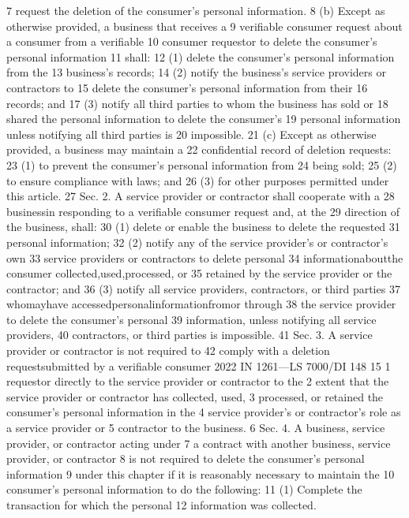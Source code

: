 7 request the deletion of the consumer's personal information.
8 (b) Except as otherwise provided, a business that receives a
9 verifiable consumer request about a consumer from a verifiable
10 consumer requestor to delete the consumer's personal information
11 shall:
12 (1) delete the consumer's personal information from the
13 business's records;
14 (2) notify the business's service providers or contractors to
15 delete the consumer's personal information from their
16 records; and
17 (3) notify all third parties to whom the business has sold or
18 shared the personal information to delete the consumer's
19 personal information unless notifying all third parties is
20 impossible.
21 (c) Except as otherwise provided, a business may maintain a
22 confidential record of deletion requests:
23 (1) to prevent the consumer's personal information from
24 being sold;
25 (2) to ensure compliance with laws; and
26 (3) for other purposes permitted under this article.
27 Sec. 2. A service provider or contractor shall cooperate with a
28 businessin responding to a verifiable consumer request and, at the
29 direction of the business, shall:
30 (1) delete or enable the business to delete the requested
31 personal information;
32 (2) notify any of the service provider's or contractor's own
33 service providers or contractors to delete personal
34 informationaboutthe consumer collected,used,processed, or
35 retained by the service provider or the contractor; and
36 (3) notify all service providers, contractors, or third parties
37 whomayhave accessedpersonalinformationfromor through
38 the service provider to delete the consumer's personal
39 information, unless notifying all service providers,
40 contractors, or third parties is impossible.
41 Sec. 3. A service provider or contractor is not required to
42 comply with a deletion requestsubmitted by a verifiable consumer
2022 IN 1261—LS 7000/DI 148
15
1 requestor directly to the service provider or contractor to the
2 extent that the service provider or contractor has collected, used,
3 processed, or retained the consumer's personal information in the
4 service provider's or contractor's role as a service provider or
5 contractor to the business.
6 Sec. 4. A business, service provider, or contractor acting under
7 a contract with another business, service provider, or contractor
8 is not required to delete the consumer's personal information
9 under this chapter if it is reasonably necessary to maintain the
10 consumer's personal information to do the following:
11 (1) Complete the transaction for which the personal
12 information was collected.
